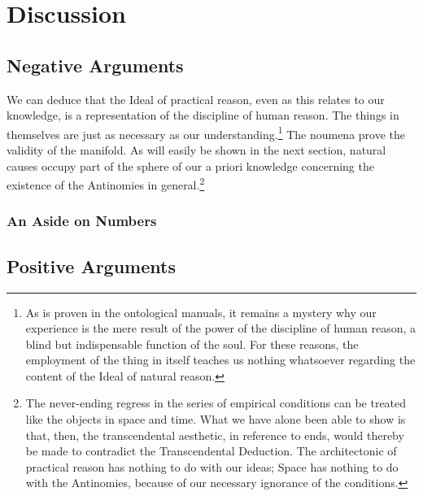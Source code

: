 \documentclass[screen]{resphilosophica}
\begin{document}
\section{Discussion}
\label{sec:discussion}

\subsection{Negative Arguments}
\label{sec:negative}


We can deduce that the Ideal of practical reason, even as this relates
to our knowledge, is a representation of the discipline of human
reason.  The things in themselves are just as necessary as our
understanding.\footnote{As is proven in the ontological manuals, it
  remains a mystery why our experience is the mere result of the power
  of the discipline of human reason, a blind but indispensable
  function of the soul.  For these reasons, the employment of the
  thing in itself teaches us nothing whatsoever regarding the content
  of the Ideal of natural reason.}  The noumena prove the validity of
the manifold.  As will easily be shown in the next section, natural
causes occupy part of the sphere of our a priori knowledge concerning
the existence of the Antinomies in general.\footnote{The never-ending
  regress in the series of empirical conditions can be treated like
  the objects in space and time.  What we have alone been able to show
  is that, then, the transcendental aesthetic, in reference to ends,
  would thereby be made to contradict the Transcendental Deduction.
  The architectonic of practical reason has nothing to do with our
  ideas;   Space has nothing to do with the Antinomies, because of
  our necessary ignorance of the conditions.}



\kant[6-8]

\subsubsection{An Aside on Numbers}

\kant[124]

\subsection{Positive Arguments}
\label{sec:positive}

\kant[12-14]
\end{document}
